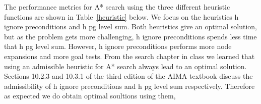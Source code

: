 \documentclass[11pt]{article}
\begin{document}
\begin{table}[h!]
\caption{Performance metrics of three uninformed search techniques}
\centering
{}
\label{uninformed}
\end{table}

The performance metrics for A* search using the three different heuristic functions are shown in Table~\ref{heuristic} below. 
We focus on the heuristics h ignore preconditions and h pg level sum. Both heuristics give an optimal solution, but as the problem gets more challenging,
 h ignore preconditions spends less time that h pg level sum. However, h ignore preconditions performs more node expansions and more goal tests. From the search chapter in class we learned that using an admissible heuristic for A* search always lead to an optimal solution. Sections 10.2.3 and 10.3.1 of the third edition of the AIMA textbook discuss the admissibility of h ignore preconditions and h pg level sum respectively. Therefore as expected we do obtain optimal soultions using them, \\
\end{document}

